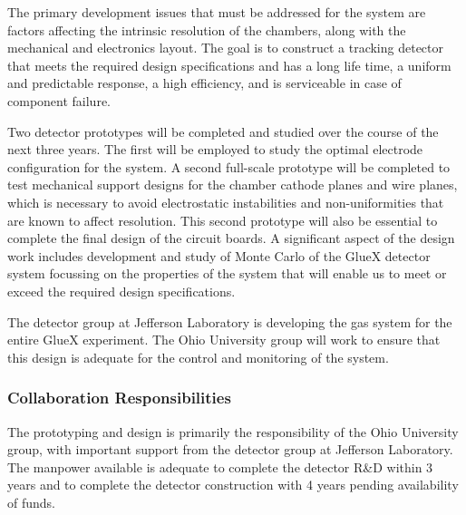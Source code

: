 The primary development issues that must be addressed for the \fdc{} system
are factors affecting the intrinsic resolution of the chambers, along with 
the mechanical and electronics layout.  The goal is to construct a tracking 
detector that meets the required design specifications and has a long life 
time, a uniform and predictable response, a high efficiency, and is 
serviceable in case of component failure.

Two detector prototypes will be completed and studied over the course
of the next three years.  The first will be employed to study the optimal 
electrode configuration for the system.  A second full-scale prototype
will be completed to test mechanical support designs for the chamber 
cathode planes and wire planes, which is necessary to avoid electrostatic 
instabilities and non-uniformities that are known to affect resolution. 
This second prototype will also be essential to complete the final design 
of the \fdc{} circuit boards.  A significant aspect of the design work includes 
development and study of Monte Carlo of the GlueX detector system focussing 
on the properties of the \fdc{} system that will enable us to meet or exceed 
the required design specifications.

The detector group at Jefferson Laboratory is developing the gas system
for the entire GlueX experiment.  The Ohio University group will work
to ensure that this design is adequate for the control and monitoring
of the \fdc{} system.

\subsubsection*{Collaboration Responsibilities}

The \fdc{} prototyping and design is primarily the responsibility of
the Ohio University group, with important support from the detector
group at Jefferson Laboratory.  The manpower available is adequate
to complete the detector R\&D within 3 years and to complete the
detector construction with 4 years pending availability of funds.

